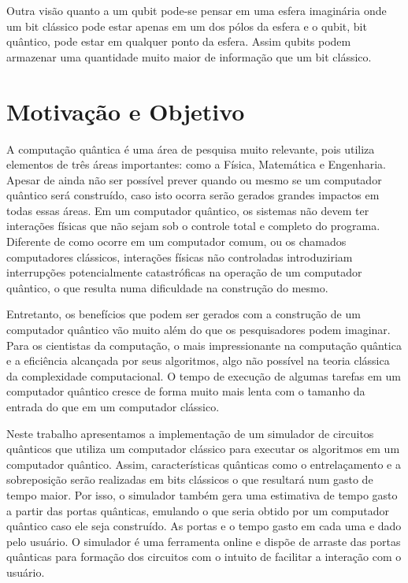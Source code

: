 \documentclass[a4paper, 12pt, oneside]{book}
\begin{document}
Outra visão quanto a um qubit pode-se pensar em uma esfera imaginária onde um bit clássico pode estar apenas em um dos pólos da esfera e o qubit, bit quântico, pode estar em qualquer ponto da esfera. Assim qubits podem armazenar uma quantidade muito maior de informação que um bit clássico.

\section{Motivação e Objetivo}

A computação quântica é uma área de pesquisa muito relevante, pois utiliza elementos de três áreas importantes: como a Física, Matemática e Engenharia. Apesar de ainda não ser possível prever quando ou mesmo se um computador quântico será construído, caso isto ocorra serão gerados grandes impactos em todas essas áreas. Em um computador quântico, os sistemas não devem ter interações físicas que não sejam sob o controle total e completo do programa. Diferente de como ocorre em um computador comum, ou os chamados computadores clássicos, interações físicas não controladas introduziriam interrupções potencialmente catastróficas na operação de um computador quântico, o que resulta numa dificuldade na construção do mesmo. 

Entretanto, os benefícios que podem ser gerados com a construção de um computador quântico vão muito além do que os pesquisadores podem imaginar. Para os cientistas da computação, o mais impressionante na computação quântica e a eficiência alcançada por seus algoritmos, algo não possível na teoria clássica da complexidade computacional. O tempo de execução de algumas tarefas em um computador quântico cresce de forma muito mais lenta com o tamanho da entrada do que em um computador clássico. 

Neste trabalho apresentamos a implementação de um simulador de circuitos quânticos que utiliza um computador clássico para executar os algoritmos em um computador quântico. Assim, características quânticas como o entrelaçamento e a sobreposição serão realizadas em bits clássicos o que resultará num gasto de tempo maior. Por isso, o simulador também gera uma estimativa de tempo gasto a partir das portas quânticas, emulando o que seria obtido por um computador quântico caso ele seja construído. As portas e o tempo gasto em cada uma e dado pelo usuário. O simulador é uma ferramenta online e dispõe de arraste das portas quânticas para formação dos circuitos com o intuito de facilitar a interação com o usuário.
\end{document}
